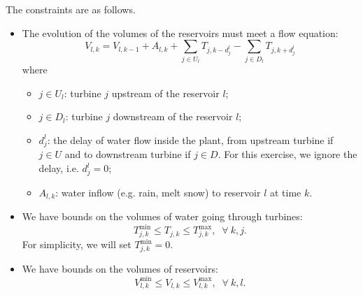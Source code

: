 \documentclass[11pt]{article}
\begin{document}
The constraints are as follows.
\begin{itemize}
\item The evolution of the volumes of the reservoirs must meet a flow equation:
\[
V_{l,k} = V_{l,k-1} + A_{l,k} + \sum_{j \in U_l} T_{j,k - d_{j}^l} - \sum_{j \in D_l} T_{j,k + d_{j}^l}
\]
where
\begin{itemize}
\item $j \in U_l$: turbine $j$ upstream of the reservoir $l$;
\item $j \in D_l$: turbine $j$ downstream of the reservoir $l$;
\item $d_{j}^{l}$: the delay of water flow inside the plant, from upstream turbine if $j \in U$ and to downstream turbine if $j \in D$. For this exercise, we ignore the delay, i.e. $d_{j}^{l} = 0$;
\item $A_{l,k}$:  water inflow (e.g. rain, melt snow) to reservoir $l$ at time $k$.
\end{itemize}

\item We have bounds on the volumes of water going through turbines:
\[
T_{j,k}^{\min} \le T_{j,k} \le T_{j,k}^{\max}, \;\; \forall \: k, j.
\]
For simplicity, we will set $T_{j,k}^{\min} = 0$.

\item We have bounds on the volumes of reservoirs:
\[
V_{l,k}^{\min} \le V_{l,k} \le V_{l, k}^{\max}, \;\; \forall \: k, l.
\]
\end{itemize}
\end{document}
